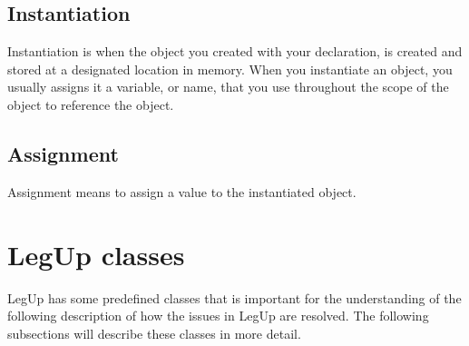 \subsection{Instantiation}
Instantiation is when the object you created with your declaration, is created and stored at a designated location in memory. When you instantiate an object, you usually assigns it a variable, or name, that you use throughout the scope of the object to reference the object.
\subsection{Assignment}
Assignment means to assign a value to the instantiated object.

\section{\label{sec:legupclasses}LegUp classes}
LegUp has some predefined classes that is important for the understanding of the following description of how the issues in LegUp are resolved. The following subsections will describe these classes in more detail.
